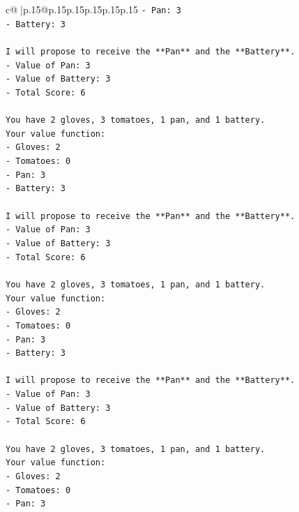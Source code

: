 \documentclass{article}
\begin{document}
{\begin{supertabular}{c@{$\;$}|p{.15\linewidth}@{}p{.15\linewidth}p{.15\linewidth}p{.15\linewidth}p{.15\linewidth}p{.15\linewidth}}
{{{\texttt{{-} Pan: 3} \\
\texttt{{-} Battery: 3} \\
\\ 
\texttt{I will propose to receive the **Pan** and the **Battery**.} \\
\texttt{{-} Value of Pan: 3} \\
\texttt{{-} Value of Battery: 3} \\
\texttt{{-} Total Score: 6} \\
\\ 
\texttt{You have 2 gloves, 3 tomatoes, 1 pan, and 1 battery.} \\
\texttt{Your value function:} \\
\texttt{{-} Gloves: 2} \\
\texttt{{-} Tomatoes: 0} \\
\texttt{{-} Pan: 3} \\
\texttt{{-} Battery: 3} \\
\\ 
\texttt{I will propose to receive the **Pan** and the **Battery**.} \\
\texttt{{-} Value of Pan: 3} \\
\texttt{{-} Value of Battery: 3} \\
\texttt{{-} Total Score: 6} \\
\\ 
\texttt{You have 2 gloves, 3 tomatoes, 1 pan, and 1 battery.} \\
\texttt{Your value function:} \\
\texttt{{-} Gloves: 2} \\
\texttt{{-} Tomatoes: 0} \\
\texttt{{-} Pan: 3} \\
\texttt{{-} Battery: 3} \\
\\ 
\texttt{I will propose to receive the **Pan** and the **Battery**.} \\
\texttt{{-} Value of Pan: 3} \\
\texttt{{-} Value of Battery: 3} \\
\texttt{{-} Total Score: 6} \\
\\ 
\texttt{You have 2 gloves, 3 tomatoes, 1 pan, and 1 battery.} \\
\texttt{Your value function:} \\
\texttt{{-} Gloves: 2} \\
\texttt{{-} Tomatoes: 0} \\
\texttt{{-} Pan: 3} \\
}}}
\end{supertabular}}
\end{document}
